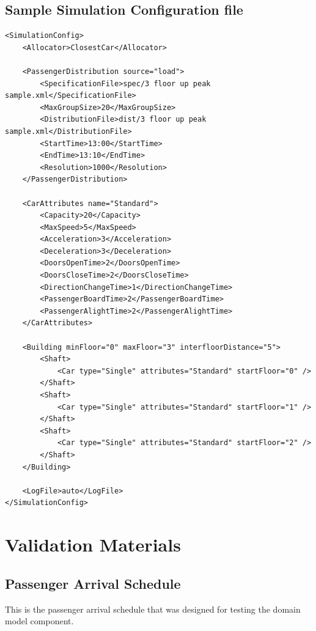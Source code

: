 \documentclass{UoYCSproject}
\begin{document}
\subsection{Sample Simulation Configuration file}

\begin{lstlisting}
<SimulationConfig>
	<Allocator>ClosestCar</Allocator>
	
	<PassengerDistribution source="load">
		<SpecificationFile>spec/3 floor up peak sample.xml</SpecificationFile>
		<MaxGroupSize>20</MaxGroupSize>
		<DistributionFile>dist/3 floor up peak sample.xml</DistributionFile>
		<StartTime>13:00</StartTime>
		<EndTime>13:10</EndTime>
		<Resolution>1000</Resolution>
	</PassengerDistribution>
	
	<CarAttributes name="Standard">
		<Capacity>20</Capacity>
		<MaxSpeed>5</MaxSpeed>
		<Acceleration>3</Acceleration>
		<Deceleration>3</Deceleration>
		<DoorsOpenTime>2</DoorsOpenTime>
		<DoorsCloseTime>2</DoorsCloseTime>
		<DirectionChangeTime>1</DirectionChangeTime>
		<PassengerBoardTime>2</PassengerBoardTime>
		<PassengerAlightTime>2</PassengerAlightTime>
	</CarAttributes>
	
	<Building minFloor="0" maxFloor="3" interfloorDistance="5">
		<Shaft>
			<Car type="Single" attributes="Standard" startFloor="0" />
		</Shaft>
		<Shaft>
			<Car type="Single" attributes="Standard" startFloor="1" />
		</Shaft>
		<Shaft>
			<Car type="Single" attributes="Standard" startFloor="2" />
		</Shaft>
	</Building>
	
	<LogFile>auto</LogFile>
</SimulationConfig>
\end{lstlisting}

\section{Validation Materials}

\subsection{Passenger Arrival Schedule}

This is the passenger arrival schedule that was designed for testing the domain model component.
\end{document}
